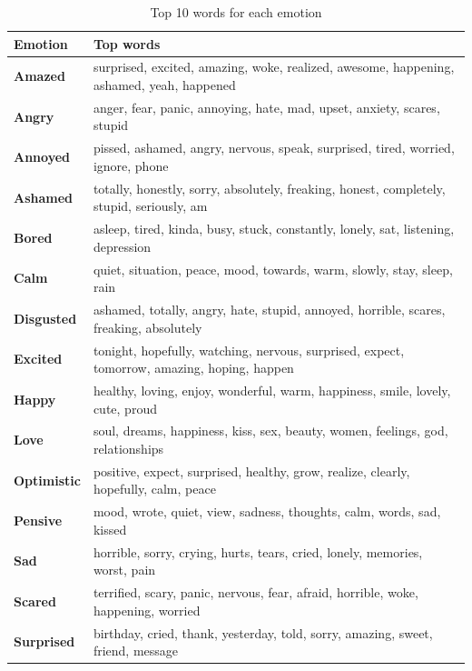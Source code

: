 \documentclass{article} %
\begin{document}
\begin{table}[H]
\caption{Top 10 words for each emotion}
\begin{center}
    \begin{tabular}{ l | l}
    Emotion & Top words\\
    \hline
    \textbf{Amazed} & surprised, excited, amazing, woke, realized, awesome, happening, ashamed, yeah, happened\\
    \textbf{Angry} & anger, fear, panic, annoying, hate, mad, upset, anxiety, scares, stupid\\
    \textbf{Annoyed} & pissed, ashamed, angry, nervous, speak, surprised, tired, worried, ignore, phone\\
    \textbf{Ashamed} & totally, honestly, sorry, absolutely, freaking, honest, completely, stupid, seriously, am\\
    \textbf{Bored} & asleep, tired, kinda, busy, stuck, constantly, lonely, sat, listening, depression\\
    \textbf{Calm} & quiet, situation, peace, mood, towards, warm, slowly, stay, sleep, rain\\
    \textbf{Disgusted} & ashamed, totally, angry, hate, stupid, annoyed, horrible, scares, freaking, absolutely\\
    \textbf{Excited} & tonight, hopefully, watching, nervous, surprised, expect, tomorrow, amazing, hoping, happen\\
    \textbf{Happy} & healthy, loving, enjoy, wonderful, warm, happiness, smile, lovely, cute, proud\\
    \textbf{Love} & soul, dreams, happiness, kiss, sex, beauty, women, feelings, god, relationships \\
    \textbf{Optimistic} & positive, expect, surprised, healthy, grow, realize, clearly, hopefully, calm, peace\\
    \textbf{Pensive} & mood, wrote, quiet, view, sadness, thoughts, calm, words, sad, kissed\\
    \textbf{Sad} & horrible, sorry, crying, hurts, tears, cried, lonely, memories, worst, pain\\
    \textbf{Scared} & terrified, scary, panic, nervous, fear, afraid, horrible, woke, happening, worried\\
    \textbf{Surprised} & birthday, cried, thank, yesterday, told, sorry, amazing, sweet, friend,  message\\
    \end{tabular}
\end{center} 
\label{top-words}
\end{table}
\end{document}
